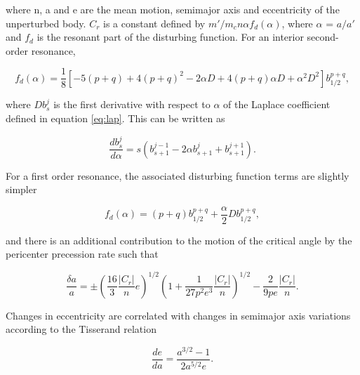 \documentclass[twocolumn]{aastex63}
\begin{document}
\noindent where n, a and e are the mean motion, semimajor axis and eccentricity of the unperturbed body. $C_{r}$ is a constant defined by 
$m'/m_{c} n \alpha f_{d}(\alpha)$, where $\alpha$ = $a/a'$ and $f_{d}$ is the resonant part of the disturbing function. For an interior second-order 
resonance,

\begin{equation}\label{eq:fd_so}
	f_{d} (\alpha) = \frac{1}{8} \left[ -5(p+q) + 4(p+q)^{2} - 2 \alpha D + 4(p+q) \alpha D + \alpha^{2} D^{2} \right] b^{p+q}_{1/2},
\end{equation}

\noindent where $D b^{j}_{s}$ is the first derivative with respect to $\alpha$ of the Laplace coefficient defined in equation \ref{eq:lap}. This can 
be written as

\begin{equation}\label{eq:lap_d}
	\frac{d b_{s}^{j}}{d \alpha} = s \left( b_{s+1}^{j-1} - 2 \alpha b_{s+1}^{j} + b_{s+1}^{j+1} \right).
\end{equation}

For a first order resonance, the associated disturbing function terms are slightly simpler

\begin{equation}\label{eq:fd_fo}
	f_{d}(\alpha) = (p+q) b_{1/2}^{p+q} + \frac{\alpha}{2} D b_{1/2}^{p+q},
\end{equation}

\noindent and there is an additional contribution to the motion of the critical angle by the pericenter precession rate such that

\begin{equation}\label{eq:res_fo}
	\frac{\delta a}{a} = \pm \left(\frac{16}{3} \frac{\left| C_{r} \right|}{n} e \right)^{1/2} \left(  1 + \frac{1}{27 p^2 e^3} \frac{\left| C_{r} \right|}{n} 
	\right)^{1/2} - \frac{2}{9 p e}  \frac{\left| C_{r} \right|}{n}.
\end{equation}

Changes in eccentricity are correlated with changes in semimajor axis variations according to the Tisserand relation

\begin{equation}\label{eq:tiss}
	\frac{de}{da} = \frac{a^{3/2} - 1}{2 a^{5/2} e}.
\end{equation}
\end{document}
